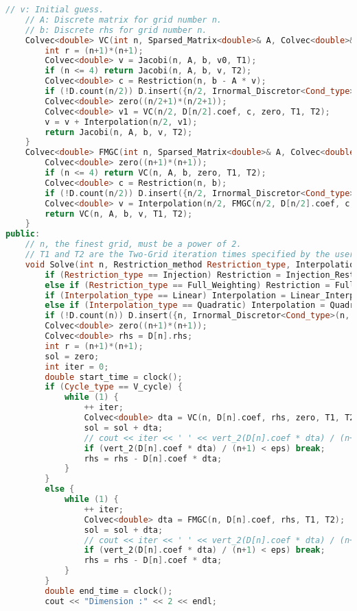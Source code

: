 \documentclass{ctexart}
\begin{document}
\begin{lstlisting}[language=c++]
	// v: Initial guess.
	// A: Discrete matrix for grid number n.
	// b: Discrete rhs for grid number n. 
	Colvec<double> VC(int n, Sparsed_Matrix<double>& A, Colvec<double>& b, Colvec<double>& v0, int T1, int T2) {
		int r = (n+1)*(n+1);
		Colvec<double> v = Jacobi(n, A, b, v0, T1);
		if (n <= 4) return Jacobi(n, A, b, v, T2);
		Colvec<double> c = Restriction(n, b - A * v);
		if (!D.count(n/2)) D.insert({n/2, Irnormal_Discretor<Cond_type>(n/2, f, g)});
		Colvec<double> zero((n/2+1)*(n/2+1));
		Colvec<double> v1 = VC(n/2, D[n/2].coef, c, zero, T1, T2);
		v = v + Interpolation(n/2, v1);
		return Jacobi(n, A, b, v, T2);
	}
	Colvec<double> FMGC(int n, Sparsed_Matrix<double>& A, Colvec<double>& b, int T1, int T2) {
		Colvec<double> zero((n+1)*(n+1));
		if (n <= 4) return VC(n, A, b, zero, T1, T2);
		Colvec<double> c = Restriction(n, b);
		if (!D.count(n/2)) D.insert({n/2, Irnormal_Discretor<Cond_type>(n/2, f, g)});
		Colvec<double> v = Interpolation(n/2, FMGC(n/2, D[n/2].coef, c, T1, T2));
		return VC(n, A, b, v, T1, T2);
	}
public:
	// n, the finest grid, must be a power of 2.
	// T1 and T2 are the Two-Grid iteration times specified by the user.
	void Solve(int n, Restriction_method Restriction_type, Interpolation_method Interpolation_type, Cycle_method Cycle_type, int T1 = 5, int T2 = 5, double eps = 1e-8, bool is_test = 0, const Function_2D<double>& real = _0_2D<double>()) {
		if (Restriction_type == Injection) Restriction = Injection_Restriction_2D;
		else if (Restriction_type == Full_Weighting) Restriction = Full_Weighting_Restriction_2D;
		if (Interpolation_type == Linear) Interpolation = Linear_Interpolation_2D;
		else if (Interpolation_type == Quadratic) Interpolation = Quadratic_Interpolation_2D;
		if (!D.count(n)) D.insert({n, Irnormal_Discretor<Cond_type>(n, f, g)});
		Colvec<double> zero((n+1)*(n+1));
		Colvec<double> rhs = D[n].rhs;
		int r = (n+1)*(n+1);
		sol = zero;
		int iter = 0;
		double start_time = clock();
		if (Cycle_type == V_cycle) {
			while (1) {
				++ iter;
				Colvec<double> dta = VC(n, D[n].coef, rhs, zero, T1, T2);
				sol = sol + dta;
				// cout << iter << ' ' << vert_2(D[n].coef * dta) / (n+1) << endl;
				if (vert_2(D[n].coef * dta) / (n+1) < eps) break;
				rhs = rhs - D[n].coef * dta;
			}
		}
		else {
			while (1) {
				++ iter;
				Colvec<double> dta = FMGC(n, D[n].coef, rhs, T1, T2);
				sol = sol + dta;
				// cout << iter << ' ' << vert_2(D[n].coef * dta) / (n+1) << endl;
				if (vert_2(D[n].coef * dta) / (n+1) < eps) break;
				rhs = rhs - D[n].coef * dta;
			}
		}
		double end_time = clock();
		cout << "Dimension :" << 2 << endl;

\end{lstlisting}
\end{document}
